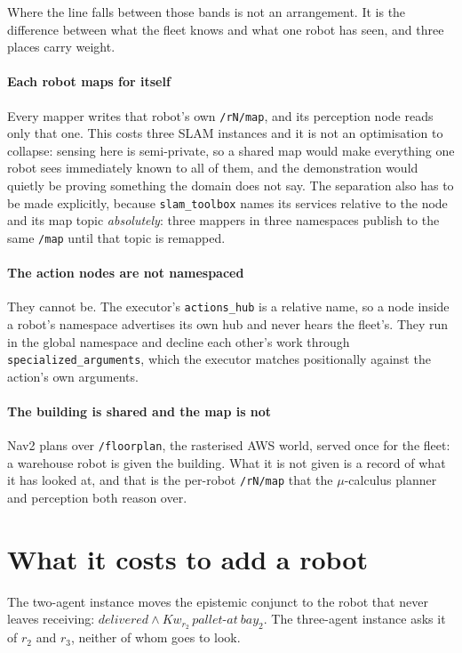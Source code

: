 \documentclass[11pt,a4paper]{article}
\theoremstyle{definition}
\newcommand{\Kw}[1]{\mathit{Kw}_{#1}}
\newcommand{\code}[1]{\texttt{\small #1}}
\begin{document}
Where the line falls between those bands is not an arrangement. It is the
difference between what the fleet knows and what one robot has seen, and three
places carry weight.

\paragraph{Each robot maps for itself} Every mapper writes that robot's own
\code{/rN/map}, and its perception node reads only that one. This costs three
SLAM instances and it is not an optimisation to collapse: sensing here is
semi-private, so a shared map would make everything one robot sees immediately
known to all of them, and the demonstration would quietly be proving something
the domain does not say. The separation also has to be made explicitly, because
\code{slam\_toolbox} names its services relative to the node and its map topic
\emph{absolutely}: three mappers in three namespaces publish to the same
\code{/map} until that topic is remapped.

\paragraph{The action nodes are not namespaced} They cannot be. The executor's
\code{actions\_hub} is a relative name, so a node inside a robot's namespace
advertises its own hub and never hears the fleet's. They run in the global
namespace and decline each other's work through
\code{specialized\_arguments}, which the executor matches positionally against
the action's own arguments.

\paragraph{The building is shared and the map is not} Nav2 plans over
\code{/floorplan}, the rasterised AWS world, served once for the fleet: a
warehouse robot is given the building. What it is not given is a record of what
it has looked at, and that is the per-robot \code{/rN/map} that the
$\mu$-calculus planner and perception both reason over.

\section{What it costs to add a robot}

The two-agent instance moves the epistemic conjunct to the robot that never
leaves receiving: $\mathit{delivered} \wedge
\Kw{r_2}\,\mathit{pallet\text{-}at\ bay_2}$. The three-agent instance asks it of
$r_2$ and $r_3$, neither of whom goes to look.
\end{document}
